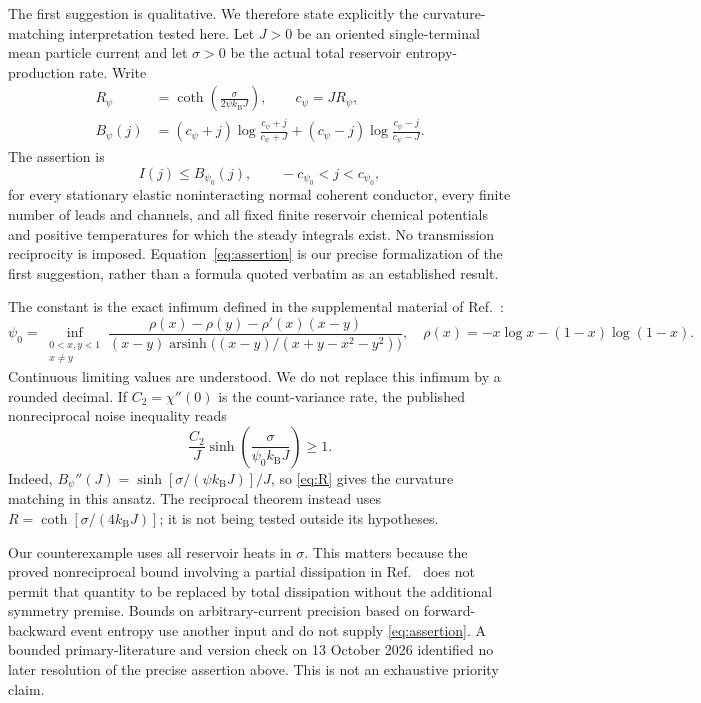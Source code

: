 \documentclass[11pt,a4paper]{article}
\newcommand{\kb}{k_{\mathrm B}}
\newcommand{\asinh}{\operatorname{arsinh}}
\begin{document}
The first suggestion is qualitative. We therefore state explicitly the
curvature-matching interpretation tested here. Let $J>0$ be an oriented
single-terminal mean particle current and let $\sigma>0$ be the actual total
reservoir entropy-production rate. Write
\begin{align}
 R_\psi&=\coth\!\left(\frac{\sigma}{2\psi\kb J}\right),\qquad c_\psi=JR_\psi,
 \label{eq:R}\\
 B_\psi(j)&=(c_\psi+j)\log\frac{c_\psi+j}{c_\psi+J}
 +(c_\psi-j)\log\frac{c_\psi-j}{c_\psi-J}.
 \label{eq:B}
\end{align}
The assertion is
\begin{equation}
 I(j)\le B_{\psi_0}(j),\qquad -c_{\psi_0}<j<c_{\psi_0},
 \label{eq:assertion}
\end{equation}
for every stationary elastic noninteracting normal coherent conductor, every
finite number of leads and channels, and all fixed finite reservoir chemical
potentials and positive temperatures for which the steady integrals exist.
No transmission reciprocity is imposed. Equation~\eqref{eq:assertion} is our
precise formalization of the first suggestion, rather than a formula quoted
verbatim as an established result.

The constant is the exact infimum defined in the supplemental material of
Ref.~\cite{BrandnerSaitoPRL2025}:
\begin{equation}
 \psi_0=\inf_{\substack{0<x,y<1\\x\ne y}}
 \frac{\rho(x)-\rho(y)-\rho'(x)(x-y)}
 {(x-y)\asinh\!\bigl((x-y)/(x+y-x^2-y^2)\bigr)},
 \quad \rho(x)=-x\log x-(1-x)\log(1-x).
 \label{eq:psi}
\end{equation}
Continuous limiting values are understood. We do not replace this infimum
by a rounded decimal. If $C_2=\chi''(0)$ is the count-variance rate, the
published nonreciprocal noise inequality reads
\begin{equation}
 \frac{C_2}{J}\sinh\!\left(\frac{\sigma}{\psi_0\kb J}\right)\ge1.
 \label{eq:noise}
\end{equation}
Indeed, $B_\psi''(J)=\sinh[\sigma/(\psi\kb J)]/J$, so
\eqref{eq:R} gives the curvature matching in this ansatz. The reciprocal
theorem instead uses $R=\coth[\sigma/(4\kb J)]$; it is not being tested
outside its hypotheses.

Our counterexample uses all reservoir heats in $\sigma$. This matters because
the proved nonreciprocal bound involving a partial dissipation in
Ref.~\cite{BrandnerSaitoJPA2025} does not permit that quantity to be replaced
by total dissipation without the additional symmetry premise. Bounds on
arbitrary-current precision based on forward-backward event entropy
\cite{TesserSplettstoesser2026} use another input and do not supply
\eqref{eq:assertion}. A bounded primary-literature and version check on
13 October 2026 identified no later resolution of the precise assertion
above. This is not an exhaustive priority claim.
\end{document}
